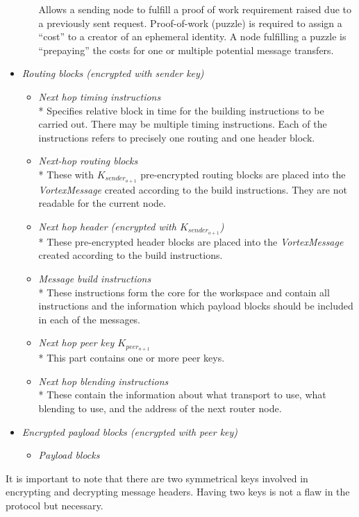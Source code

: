 \documentclass[acmsmall, screen]{acmart}
\begin{document}
\begin{itemize}
\begin{itemize}
		Allows a sending node to fulfill a proof of work requirement raised due to a previously sent request. Proof-of-work (puzzle) is required to assign a ``cost'' to a creator of an ephemeral identity. A node fulfilling a puzzle is ``prepaying'' the costs for one or multiple potential message transfers. 
	\end{itemize}
	\item \emph{Routing blocks (encrypted with sender key)}
	\begin{itemize}
		\item \emph{Next hop timing instructions}\\*
		Specifies relative block in time for the building instructions to be carried out. There may be multiple timing instructions. Each of the instructions refers to precisely one routing and one header block.
		\item \emph{Next-hop routing blocks}\\*
		These with $K_{sender_{o+1}}$ pre-encrypted routing blocks are placed into the \emph{VortexMessage} created according to the build instructions. They are not readable for the current node.
		\item \emph{Next hop header (encrypted with $K_{sender_{o+1}}$)}\\*
		These pre-encrypted header blocks are placed into the \emph{VortexMessage} created according to the build instructions.
		\item \emph{Message build instructions}\\*
		These instructions form the core for the workspace and contain all instructions and the information which payload blocks should be included in each of the messages.
		\item \emph{Next hop peer key $K_{peer_{o+1}}$}\\*
		This part contains one or more peer keys.
		\item \emph{Next hop blending instructions}\\*
		These contain the information about what transport to use, what blending to use, and the address of the next router node.
	\end{itemize}
	\item \emph{Encrypted payload blocks (encrypted with peer key)}
	\begin{itemize}
		\item \emph{Payload blocks}
	\end{itemize}
\end{itemize}

It is important to note that there are two symmetrical keys involved in encrypting and decrypting message headers. Having two keys is not a flaw in the protocol but necessary. 
\end{document}

